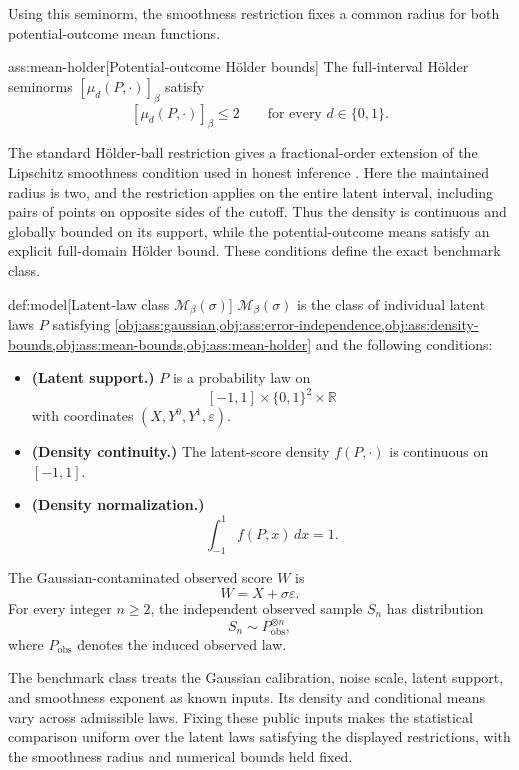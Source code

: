 \documentclass[11pt]{article}
\begin{document}
Using this seminorm, the smoothness restriction fixes a common radius for both potential-outcome mean functions.

\begin{assumptionv}{ass:mean-holder}[Potential-outcome Hölder bounds]
The full-interval Hölder seminorms \([\mu_d(P,\cdot)]_\beta\) satisfy
\[
[\mu_d(P,\cdot)]_\beta\le2
\qquad\text{for every }d\in\{0,1\}.
\]
\end{assumptionv}

The standard Hölder-ball restriction gives a fractional-order extension of the Lipschitz smoothness condition used in honest inference \citep{ArmstrongKolesar2020SimpleHonest}. Here the maintained radius is two, and the restriction applies on the entire latent interval, including pairs of points on opposite sides of the cutoff. Thus the density is continuous and globally bounded on its support, while the potential-outcome means satisfy an explicit full-domain Hölder bound. These conditions define the exact benchmark class.

\begin{definitionv}{def:model}[Latent-law class \(\mathcal M_\beta(\sigma)\)]
\(\mathcal M_\beta(\sigma)\) is the class of individual latent laws \(P\) satisfying \cref{obj:ass:gaussian,obj:ass:error-independence,obj:ass:density-bounds,obj:ass:mean-bounds,obj:ass:mean-holder} and the following conditions:
\begin{itemize}
\item \textbf{(Latent support.)} \(P\) is a probability law on
\[
[-1,1]\times\{0,1\}^{2}\times\mathbb R
\]
with coordinates \((X,Y^0,Y^1,\varepsilon)\).
\item \textbf{(Density continuity.)} The latent-score density \(f(P,\cdot)\) is continuous on \([-1,1]\).
\item \textbf{(Density normalization.)}
\[
\int_{-1}^{1}f(P,x)\,dx=1.
\]
\end{itemize}
The Gaussian-contaminated observed score \(W\) is
\[
W=X+\sigma\varepsilon.
\]
For every integer \(n\ge2\), the independent observed sample \(S_n\) has distribution
\[
S_n\sim P_{\mathrm{obs}}^{\otimes n},
\]
where \(P_{\mathrm{obs}}\) denotes the induced observed law.
\end{definitionv}

The benchmark class  treats the Gaussian calibration, noise scale, latent support, and smoothness exponent as known inputs. Its density and conditional means vary across admissible laws. Fixing these public inputs makes the statistical comparison uniform over the latent laws satisfying the displayed restrictions, with the smoothness radius and numerical bounds held fixed.
\end{document}
